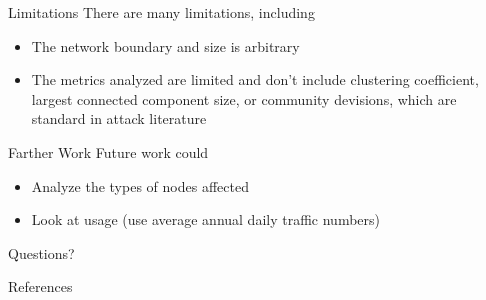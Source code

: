 \documentclass{beamer}
\numberwithin{figure}{section} %
\numberwithin{table}{section} %
\begin{document}
\begin{frame}{Limitations}
    There are many limitations, including
    \begin{itemize}
        \item The network boundary and size is arbitrary
        \item The metrics analyzed are limited and don't include clustering coefficient, largest connected component size, or community devisions, which are standard in attack literature {\tiny \parencite{Xeumei10}}
    \end{itemize}
\end{frame}

\begin{frame}{Farther Work}
    Future work could
    \begin{itemize}
        \item Analyze the types of nodes affected 
        \item Look at usage (use average annual daily traffic numbers)
    \end{itemize}
\end{frame}

\begin{frame}[standout]
    Questions?
\end{frame}


\appendix

\begin{frame}[allowframebreaks]{References}
    \printbibliography[heading=none]
\end{frame}
\end{document}
